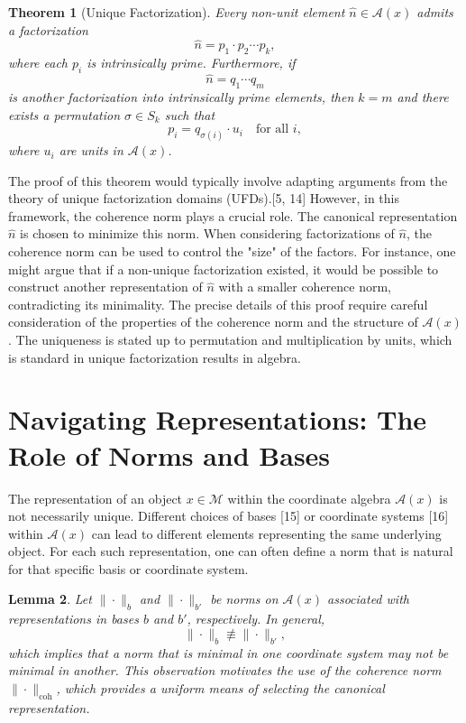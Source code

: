 \documentclass{article}
\newtheorem{theorem}{Theorem}[section]
\newtheorem{lemma}[theorem]{Lemma}
\begin{document}
\begin{theorem}[Unique Factorization]
Every non-unit element $\hat{n} \in \mathcal{A}(x)$ admits a factorization
\[
\hat{n} = p_1 \cdot p_2 \cdots p_k,
\]
where each $p_i$ is intrinsically prime. Furthermore, if
\[
\hat{n} = q_1 \cdots q_m
\]
is another factorization into intrinsically prime elements, then $k = m$ and there exists a permutation $\sigma \in S_k$ such that
\[
p_i = q_{\sigma(i)} \cdot u_i \quad \text{for all } i,
\]
where $u_i$ are units in $\mathcal{A}(x)$.
\end{theorem}

The proof of this theorem would typically involve adapting arguments from the theory of unique factorization domains (UFDs).[5, 14] However, in this framework, the coherence norm plays a crucial role. The canonical representation $\hat{n}$ is chosen to minimize this norm. When considering factorizations of $\hat{n}$, the coherence norm can be used to control the "size" of the factors. For instance, one might argue that if a non-unique factorization existed, it would be possible to construct another representation of $\hat{n}$ with a smaller coherence norm, contradicting its minimality. The precise details of this proof require careful consideration of the properties of the coherence norm and the structure of $\mathcal{A}(x)$. The uniqueness is stated up to permutation and multiplication by units, which is standard in unique factorization results in algebra.

\section{Navigating Representations: The Role of Norms and Bases}

The representation of an object $x \in \mathcal{M}$ within the coordinate algebra $\mathcal{A}(x)$ is not necessarily unique. Different choices of bases [15] or coordinate systems [16] within $\mathcal{A}(x)$ can lead to different elements representing the same underlying object. For each such representation, one can often define a norm that is natural for that specific basis or coordinate system.

\begin{lemma}
Let $\|\cdot\|_b$ and $\|\cdot\|_{b'}$ be norms on $\mathcal{A}(x)$ associated with representations in bases $b$ and $b'$, respectively. In general,
\[
\|\cdot\|_b \not\equiv \|\cdot\|_{b'},
\]
which implies that a norm that is minimal in one coordinate system may not be minimal in another. This observation motivates the use of the coherence norm $\|\cdot\|_{\mathrm{coh}}$, which provides a uniform means of selecting the canonical representation.
\end{lemma}
\end{document}
